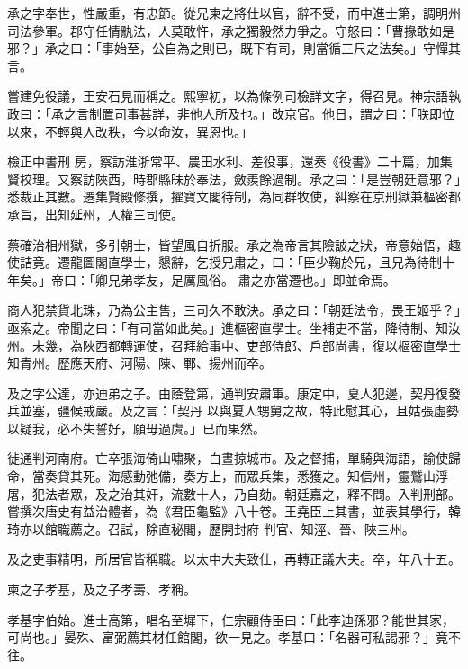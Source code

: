 \begin{pinyinscope}
 承之字奉世，性嚴重，有忠節。從兄柬之將仕以官，辭不受，而中進士第，調明州司法參軍。郡守任情骫法，人莫敢忤，承之獨毅然力爭之。守怒曰：「曹掾敢如是邪？」承之曰：「事始至，公自為之則已，既下有司，則當循三尺之法矣。」守憚其言。



 嘗建免役議，王安石見而稱之。熙寧初，以為條例司檢詳文字，得召見。神宗語執政曰：「承之言制置司事甚詳，非他人所及也。」改京官。他日，謂之曰：「朕即位以來，不輕與人改秩，今以命汝，異恩也。」



 檢正中書刑
 房，察訪淮浙常平、農田水利、差役事，還奏《役書》二十篇，加集賢校理。又察訪陜西，時郡縣昧於奉法，斂羨餘過制。承之曰：「是豈朝廷意邪？」悉裁正其數。遷集賢殿修撰，擢寶文閣待制，為同群牧使，糾察在京刑獄兼樞密都承旨，出知延州，入權三司使。



 蔡確治相州獄，多引朝士，皆望風自折服。承之為帝言其險詖之狀，帝意始悟，趣使詰竟。遷龍圖閣直學士，懇辭，乞授兄肅之，曰：「臣少鞠於兄，且兄為待制十年矣。」帝曰：「卿兄弟孝友，足厲風俗。
 肅之亦當遷也。」即並命焉。



 商人犯禁貨北珠，乃為公主售，三司久不敢決。承之曰：「朝廷法令，畏王姬乎？」亟索之。帝聞之曰：「有司當如此矣。」進樞密直學士。坐補吏不當，降待制、知汝州。未幾，為陜西都轉運使，召拜給事中、吏部侍郎、戶部尚書，復以樞密直學士知青州。歷應天府、河陽、陳、鄆、揚州而卒。



 及之字公達，亦迪弟之子。由蔭登第，通判安肅軍。康定中，夏人犯邊，契丹復發兵並塞，疆候戒嚴。及之言：「契丹
 以與夏人甥舅之故，特此慰其心，且姑張虛勢以疑我，必不失誓好，願毋過虞。」已而果然。



 徙通判河南府。亡卒張海倚山嘯聚，白晝掠城市。及之督捕，單騎與海語，諭使歸命，當奏貸其死。海感動弛備，奏方上，而眾兵集，悉獲之。知信州，靈鷲山浮屠，犯法者眾，及之治其奸，流數十人，乃自劾。朝廷嘉之，釋不問。入判刑部。嘗撰次唐史有益治體者，為《君臣龜監》八十卷。王堯臣上其書，並表其學行，韓琦亦以館職薦之。召試，除直秘閣，歷開封府
 判官、知涇、晉、陜三州。



 及之吏事精明，所居官皆稱職。以太中大夫致仕，再轉正議大夫。卒，年八十五。



 柬之子孝基，及之子孝壽、孝稱。



 孝基字伯始。進士高第，唱名至墀下，仁宗顧侍臣曰：「此李迪孫邪？能世其家，可尚也。」晏殊、富弼薦其材任館閣，欲一見之。孝基曰：「名器可私謁邪？」竟不往。




\end{pinyinscope}
